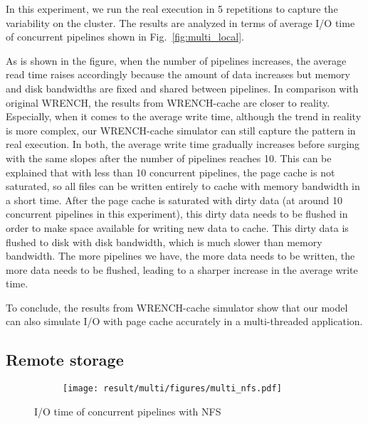 \documentclass[conference]{IEEEtran}
\begin{document}
            In this experiment, we run the real execution in 5 repetitions to
            capture the variability on the cluster.
            The results are analyzed in terms of average I/O time
            of concurrent pipelines shown in Fig.~\ref{fig:multi_local}.

            As is shown in the figure, when the number of pipelines increases,
            the average read time raises accordingly because the amount of data
            increases but memory and disk bandwidths are fixed and shared between pipelines.
            In comparison with original WRENCH, the results from WRENCH-cache are closer
            to reality.
            Especially, when it comes to the average write time,
            although the trend in reality is more complex, our WRENCH-cache
            simulator can still capture the pattern in real execution.
            In both, the average write time gradually increases before surging with the
            same slopes after the number of pipelines reaches 10.
            This can be explained that with less than 10 concurrent pipelines,
            the page cache is not saturated, so all files can be written entirely to
            cache with memory bandwidth in a short time.
            After the page cache is saturated with dirty data (at around
            10 concurrent pipelines in this experiment), this dirty data needs
            to be flushed in order to make space available for writing new data to cache.
            This dirty data is flushed to disk with disk bandwidth, which is much
            slower than memory bandwidth.
            The more pipelines we have, the more data needs to be written, the more data
            needs to be flushed, leading to a sharper increase in the average write time.

            To conclude, the results from WRENCH-cache simulator show that
            our model can also simulate I/O with page cache accurately in a
            multi-threaded application.

        \subsection{Remote storage}

            \begin{figure*}
            \begin{subfigure}{\linewidth}
                \centering
                \texttt{[image: result/multi/figures/multi\_nfs.pdf]}
            \end{subfigure}
            \caption{I/O time of concurrent pipelines with NFS}
            \label{fig:multi_nfs}
            \end{figure*}
\end{document}
